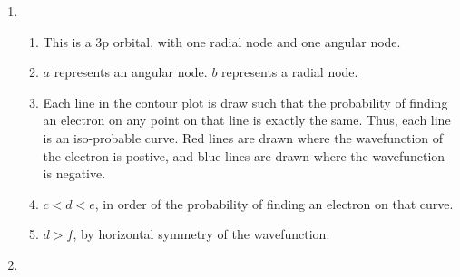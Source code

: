 \documentclass[10pt]{article}
\begin{document}
\begin{enumerate}
                \item
                \begin{enumerate}
                        \item This is a 3p orbital, with one radial node and one angular node.
                        \item $a$ represents an angular node. $b$ represents a radial node.
                        \item Each line in the contour plot is draw such that the probability of finding an electron on any point
                        on that line is exactly the same. Thus, each line is an iso-probable curve.
                        Red lines are drawn where the wavefunction of the electron is postive, and blue lines are drawn where the
                        wavefunction is negative.
                        \item $c < d < e$, in order of the probability of finding an electron on that curve.
                        \item $d > f$, by horizontal symmetry of the wavefunction.
                \end{enumerate}
                
                \item 
                
        \end{enumerate}
\end{document}
